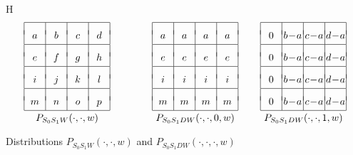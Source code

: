 \begin{myfigure}{H}
$$
{\setlength{\arraycolsep}{2.5ex}
\begin{array}{|c|c|c|c|} \hline 
& & & \\[-1ex] 
\noex a & \noex b & \noex c & \noex d \\[0.5ex] \hline 
& & & \\[-1ex] 
\noex e & \noex f & \noex g & \noex h \\[0.5ex] \hline
& & & \\[-1ex] 
\noex i & \noex j & \noex k & \noex l \\[0.5ex] \hline
& & & \\[-1ex] 
\noex m & \noex n & \noex o & \noex p \\[0.5ex] \hline
\end{array}
\atop P_{S_0 S_1 W}(\cdot,\cdot,w) }
\qquad\qquad
{\setlength{\arraycolsep}{2.5ex}
\begin{array}{|c|c|c|c|} \hline 
& & & \\[-1ex] 
\noex a & \noex a & \noex a & \noex a \\[0.5ex] \hline 
& & & \\[-1ex] 
\noex e & \noex e & \noex e & \noex e \\[0.5ex] \hline
& & & \\[-1ex] 
\noex i & \noex i & \noex i & \noex i \\[0.5ex] \hline
& & & \\[-1ex] 
\noex m & \noex m & \noex m & \noex m \\[0.5ex] \hline
\end{array}
\atop P_{S_0 S_1 D W}(\cdot,\cdot,0,w) }
\qquad
{\setlength{\arraycolsep}{2.5ex}
\begin{array}{|c|c|c|c|} \hline 
 & & & \\[-1ex] 
\noex 0 & \noex{b \m a} & \noex{c \m a} & \noex{d \m a} \\[0.5ex] \hline 
 & & & \\[-1ex] 
\noex 0 & \noex{b \m a} & \noex{c \m a} & \noex{d \m a} \\[0.5ex] \hline 
 & & & \\[-1ex] 
\noex 0 & \noex{b \m a} & \noex{c \m a} & \noex{d \m a} \\[0.5ex] \hline 
 & & & \\[-1ex] 
\noex 0 & \noex{b \m a} & \noex{c \m a} & \noex{d \m a} \\[0.5ex] \hline 
\end{array}
\atop P_{S_0 S_1 D W}(\cdot,\cdot,1,w) }
$$
\vspace{-3ex}
\caption{Distributions $P_{S_0 S_1 W}(\cdot,\cdot,w)$ and $P_{S_0 S_1
D W}(\cdot,\cdot,\cdot,w)$}\label{fig:l=2}
\end{myfigure}

